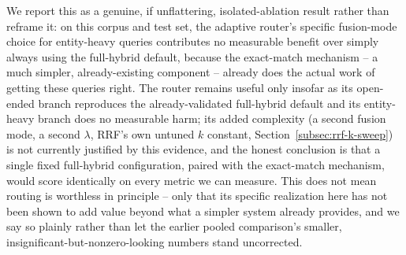 \documentclass[a4paper,twoside]{article}
\begin{document}
We report this as a genuine, if unflattering, isolated-ablation result rather than reframe it: on this corpus and test set, the adaptive router's specific fusion-mode choice for entity-heavy queries contributes no measurable benefit over simply always using the full-hybrid default, because the exact-match mechanism -- a much simpler, already-existing component -- already does the actual work of getting these queries right. The router remains useful only insofar as its open-ended branch reproduces the already-validated full-hybrid default and its entity-heavy branch does no measurable harm; its added complexity (a second fusion mode, a second $\lambda$, RRF's own untuned $k$ constant, Section~\ref{subsec:rrf-k-sweep}) is not currently justified by this evidence, and the honest conclusion is that a single fixed full-hybrid configuration, paired with the exact-match mechanism, would score identically on every metric we can measure. This does not mean routing is worthless in principle -- only that its specific realization here has not been shown to add value beyond what a simpler system already provides, and we say so plainly rather than let the earlier pooled comparison's smaller, insignificant-but-nonzero-looking numbers stand uncorrected.
\end{document}

